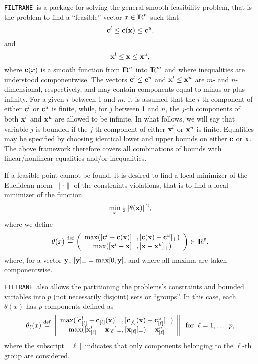 \documentclass{galahad}
\newcommand{\packagename}{FILTRANE}
\newcommand{\filtrane}{{\tt \packagename}}
\renewcommand{\Re}{\hbox{I\hskip -1.5pt R}}
\begin{document}
\galheader


\galsummary

\filtrane\ is a package for solving the general smooth feasibility
problem, that is the problem to find a ``feasible'' vector $x \in \Re^n$ such
that
\[
{\mathbf{c}}^l \leq {\mathbf{c}}({\mathbf{x}}) \leq {\mathbf{c}}^u,
\]
and
\[
{\mathbf{x}}^l \leq {\mathbf{x}} \leq {\mathbf{x}}^u,
\]
where ${\mathbf{c}}(x)$ is a smooth function from $\Re^n$ into
$\Re^m$ and where inequalities are understood componentwise.
The vectors ${\mathbf{c}}^l \leq {\mathbf{c}}^u$ and ${\mathbf{x}}^l \leq {\mathbf{x}}^u$ are $m$- and
$n$-dimensional, respectively, and may contain components equal to minus or
plus infinity. For a given $i$ between 1 and $m$, it is assumed that the
$i$-th component of either ${\mathbf{c}}^l$ or ${\mathbf{c}}^u$ is finite, while, for $j$
between 1 and $n$, the $j$-th components of both ${\mathbf{x}}^l$ and ${\mathbf{x}}^u$ are
allowed to be infinite.  In what follows, we will say that variable $j$ is
bounded if the $j$-th component of either ${\mathbf{x}}^l$ or ${\mathbf{x}}^u$ is
finite. Equalities may be specified by choosing identical lower and upper
bounds on either ${\mathbf{c}}$ or ${\mathbf{x}}$. The above framework therefore covers all
combinations of bounds with linear/nonlinear equalities and/or inequalities.

If a feasible point cannot be found, it is desired to find a local minimizer
of the Euclidean norm $\|\cdot\|$ of the constraints violations, that is to
find a local minimizer of the function
\begin{equation}\label{thetadef}
\min_x {\scriptstyle \frac{1}{2}} \| \theta({\mathbf{x}}) \|^2,
\end{equation}
where we define
\[
\theta(x) \eqdef \left( \begin{array}{c}
                 \max( [\bmc^l - \bmc(\bmx)]_+, [ \bmc( \bmx ) - \bmc^u ]_+ ) \\
                 \max( [\bmx^l - \bmx]_+, [ \bmx - \bmx^u ]_+ )
                 \end{array} \right) \in \Re^p,
\]
where, for a vector ${\mathbf{y}}$, $[{\mathbf{y}}]_+ = \max[0,{\mathbf{y}}]$, and where all maxima
are taken componentwise.

\filtrane\ also allows the partitioning the problems's constraints and bounded
variables into $p$ (not necessarily disjoint) sets or ``groups''.
In this case, each $\theta(x)$ has $p$ components defined as
\[
\theta_{\ell}(x) \stackrel{\rm def}{=}
\left\| \begin{array}{c}
    \max( [ {\mathbf{c}}^l_{[\ell]} - {\mathbf{c}}_{[\ell]}( {\mathbf{x}} )]_+,
          [ {\mathbf{c}}_{[\ell]}( {\mathbf{x}} ) - {\mathbf{c}}^u_{[\ell]} ]_+ ) \\
    \max( [ {\mathbf{x}}^l_{[\ell]} - {\mathbf{x}}_{[\ell]}]_+,
          [ {\mathbf{x}}_{[\ell]} ]_+ ) - {\mathbf{x}}^u_{[\ell]} \\
        \end{array} \right\|
\;\; \mbox{for} \;\; \ell = 1, \ldots, p,
\]
where the subscript $[\ell]$ indicates that only components belonging to
the $\ell$-th group are considered.
\end{document}

